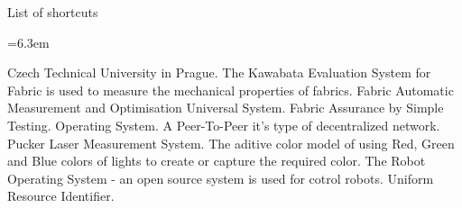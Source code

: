 \app List of shortcuts

\medskip
\bgroup \leftskip=6.3em

\abbrv[CTU]  Czech Technical University in Prague.
\abbrv[KESF]  The Kawabata Evaluation System for Fabric is used to measure the mechanical properties of fabrics.
\abbrv[FAMOUS]  Fabric Automatic Measurement and Optimisation Universal System.
\abbrv[FAST]  Fabric Assurance by Simple Testing.
\abbrv[OS]	Operating System.
\abbrv[P2P]  A Peer-To-Peer it's type of decentralized network. 
\abbrv[PLMS]  Pucker Laser Measurement System.
\abbrv[RGB]  The aditive color model of using Red, Green and Blue colors of lights to create or capture the required color.
\abbrv[ROS]  The Robot Operating System - an open source system is used for cotrol robots.  
\abbrv[URI]  Uniform Resource Identifier.

\par\egroup
